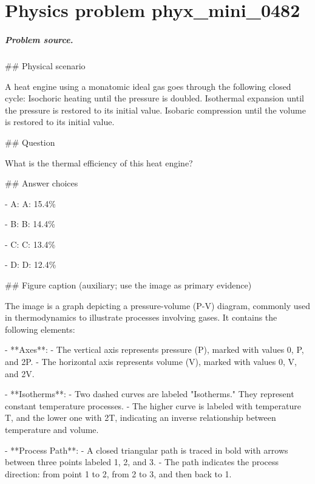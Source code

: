 
\chapter{Physics problem phyx\_mini\_0482}
\label{ch:PhyXMiniProblems_problem_phyx_mini_0482}

\paragraph{Problem source.}
\#\# Physical scenario

A heat engine using a monatomic ideal gas goes through the following closed cycle: Isochoric heating until the pressure is doubled. Isothermal expansion until the pressure is restored to its initial value. Isobaric compression until the volume is restored to its initial value.

\#\# Question

What is the thermal efficiency of this heat engine?

\#\# Answer choices

- A: A: 15.4\%

- B: B: 14.4\%

- C: C: 13.4\%

- D: D: 12.4\%

\#\# Figure caption (auxiliary; use the image as primary evidence)

The image is a graph depicting a pressure-volume (P-V) diagram, commonly used in thermodynamics to illustrate processes involving gases. It contains the following elements:

- **Axes**: 
  - The vertical axis represents pressure (P), marked with values 0, P, and 2P.
  - The horizontal axis represents volume (V), marked with values 0, V, and 2V.

- **Isotherms**: 
  - Two dashed curves are labeled "Isotherms." They represent constant temperature processes.
  - The higher curve is labeled with temperature T, and the lower one with 2T, indicating an inverse relationship between temperature and volume.

- **Process Path**:
  - A closed triangular path is traced in bold with arrows between three points labeled 1, 2, and 3.
  - The path indicates the process direction: from point 1 to 2, from 2 to 3, and then back to 1.

